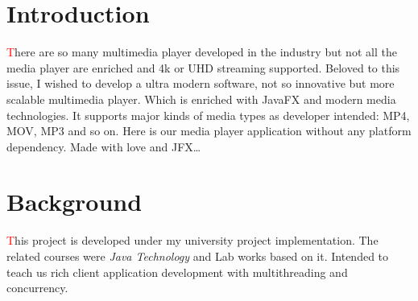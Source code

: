 \documentclass{report}
\begin{document}
\pagebreak


\tableofcontents
\listoffigures

\pagebreak

\section{Introduction}
\begin{justify}
  {\large
  \hspace*{0.5cm} \textcolor{red}{\large T}here are so many multimedia player developed in the industry but not all the media player are enriched and 4k or UHD streaming supported.
  Beloved to this issue, I wished to develop a ultra modern software, not so innovative but more scalable multimedia player.
  Which is enriched with JavaFX and modern media technologies. It supports major kinds of media types as developer intended: MP4, MOV, MP3 and so on.
  Here is our media player application without any platform dependency. Made with love and JFX\dots
  }
\end{justify}

\section{Background}
\begin{justify}
  {\large
  \hspace*{0.5cm} \textcolor{red}{\large T}his project is developed under my university project implementation.
  The related courses were \textit{Java Technology} and Lab works based on it.
  Intended to teach us rich client application development with multithreading and concurrency.
  }
\end{justify}

\pagebreak
\end{document}
